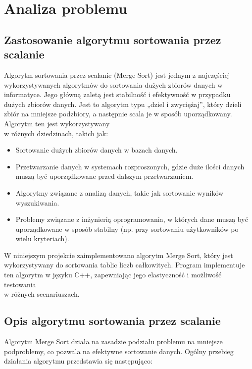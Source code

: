 \newpage
\section{Analiza problemu}
\label{sec:analiza-problemu}

\subsection{Zastosowanie algorytmu sortowania przez scalanie}

Algorytm sortowania przez scalanie (Merge Sort) jest jednym z najczęściej wykorzystywanych algorytmów do sortowania dużych zbiorów danych w informatyce. Jego główną zaletą jest stabilność i efektywność w przypadku dużych zbiorów danych. Jest to algorytm typu „dziel i zwyciężaj”, który dzieli zbiór na mniejsze podzbiory, a następnie scala je w sposób uporządkowany. Algorytm ten jest wykorzystywany \\ w różnych dziedzinach, takich jak:

\begin{itemize}
  \item Sortowanie dużych zbiorów danych w bazach danych.
  \item Przetwarzanie danych w systemach rozproszonych, gdzie duże ilości danych muszą być uporządkowane przed dalszym przetwarzaniem.
  \item Algorytmy związane z analizą danych, takie jak sortowanie wyników wyszukiwania.
  \item Problemy związane z inżynierią oprogramowania, w których dane muszą być uporządkowane w sposób stabilny (np. przy sortowaniu użytkowników po wielu kryteriach).
\end{itemize}

W niniejszym projekcie zaimplementowano algorytm Merge Sort, który jest wykorzystywany do sortowania tablic liczb całkowitych.
Program implementuje ten algorytm w języku C++, zapewniając jego elastyczność i możliwość testowania \\ w różnych scenariuszach.

\subsection{Opis algorytmu sortowania przez scalanie}

Algorytm Merge Sort działa na zasadzie podziału problemu na mniejsze podproblemy, co pozwala na efektywne sortowanie danych. Ogólny przebieg działania algorytmu przedstawia się następująco:

